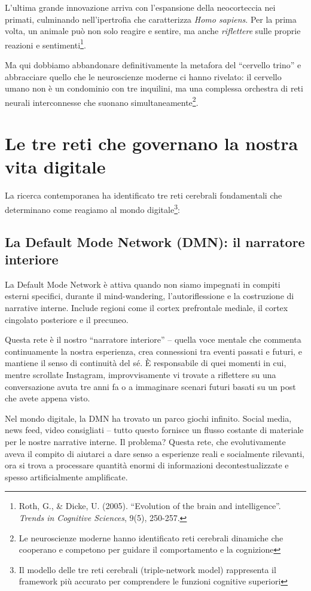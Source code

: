 L'ultima grande innovazione arriva con l'espansione della neocorteccia nei primati, culminando nell'ipertrofia che caratterizza \textit{Homo sapiens}. Per la prima volta, un animale può non solo reagire e sentire, ma anche \textit{riflettere} sulle proprie reazioni e sentimenti\footnote{Roth, G., \& Dicke, U. (2005). ``Evolution of the brain and intelligence''. \textit{Trends in Cognitive Sciences}, 9(5), 250-257.}.

Ma qui dobbiamo abbandonare definitivamente la metafora del ``cervello trino'' e abbracciare quello che le neuroscienze moderne ci hanno rivelato: il cervello umano non è un condominio con tre inquilini, ma una complessa orchestra di reti neurali interconnesse che suonano simultaneamente\footnote{Le neuroscienze moderne hanno identificato reti cerebrali dinamiche che cooperano e competono per guidare il comportamento e la cognizione}.

\section{Le tre reti che governano la nostra vita digitale}

La ricerca contemporanea ha identificato tre reti cerebrali fondamentali che determinano come reagiamo al mondo digitale\footnote{Il modello delle tre reti cerebrali (triple-network model) rappresenta il framework più accurato per comprendere le funzioni cognitive superiori}:

\subsection{La Default Mode Network (DMN): il narratore interiore}

La Default Mode Network è attiva quando non siamo impegnati in compiti esterni specifici, durante il mind-wandering, l'autoriflessione e la costruzione di narrative interne. Include regioni come il cortex prefrontale mediale, il cortex cingolato posteriore e il precuneo.

Questa rete è il nostro ``narratore interiore'' – quella voce mentale che commenta continuamente la nostra esperienza, crea connessioni tra eventi passati e futuri, e mantiene il senso di continuità del sé. È responsabile di quei momenti in cui, mentre scrollate Instagram, improvvisamente vi trovate a riflettere su una conversazione avuta tre anni fa o a immaginare scenari futuri basati su un post che avete appena visto.

Nel mondo digitale, la DMN ha trovato un parco giochi infinito. Social media, news feed, video consigliati – tutto questo fornisce un flusso costante di materiale per le nostre narrative interne. Il problema? Questa rete, che evolutivamente aveva il compito di aiutarci a dare senso a esperienze reali e socialmente rilevanti, ora si trova a processare quantità enormi di informazioni decontestualizzate e spesso artificialmente amplificate.


